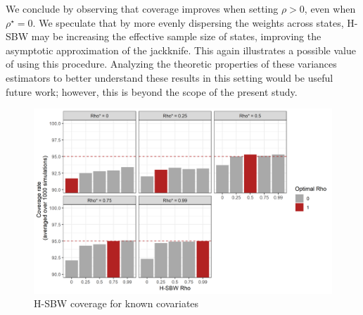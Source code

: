 We conclude by observing that coverage improves when setting $\rho > 0$, even when $\rho^\star = 0$. We speculate that by more evenly dispersing the weights across states, H-SBW may be increasing the effective sample size of states, improving the asymptotic approximation of the jackknife. This again illustrates a possible value of using this procedure. Analyzing the theoretic properties of these variances estimators to better understand these results in this setting would be useful future work; however, this is beyond the scope of the present study.

\begin{figure}[H]
\begin{center}
    \caption{H-SBW coverage for known covariates}\label{fig:hsbwcoveragex}
    \includegraphics[scale=0.5]{01_Plots/coverage-x-plot.png}
\end{center}
\end{figure}